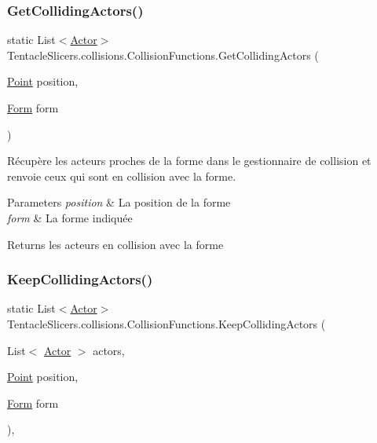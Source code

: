 \subsubsection{\texorpdfstring{Get\+Colliding\+Actors()}{GetCollidingActors()}}
{\footnotesize\ttfamily static List$<$\hyperlink{class_tentacle_slicers_1_1actors_1_1_actor}{Actor}$>$ Tentacle\+Slicers.\+collisions.\+Collision\+Functions.\+Get\+Colliding\+Actors (\begin{DoxyParamCaption}\item[{\hyperlink{class_tentacle_slicers_1_1general_1_1_point}{Point}}]{position,  }\item[{\hyperlink{class_tentacle_slicers_1_1collisions_1_1_form}{Form}}]{form }\end{DoxyParamCaption})\hspace{0.3cm}{\ttfamily [static]}}



Récupère les acteurs proches de la forme dans le gestionnaire de collision et renvoie ceux qui sont en collision avec la forme. 


\begin{DoxyParams}{Parameters}
{\em position} & La position de la forme \\
\hline
{\em form} & La forme indiquée \\
\hline
\end{DoxyParams}
\begin{DoxyReturn}{Returns}
les acteurs en collision avec la forme 
\end{DoxyReturn}
\mbox{\label{class_tentacle_slicers_1_1collisions_1_1_collision_functions_af02ae1365e63bae367e3549ce009c5e0}} 
\subsubsection{\texorpdfstring{Keep\+Colliding\+Actors()}{KeepCollidingActors()}}
{\footnotesize\ttfamily static List$<$\hyperlink{class_tentacle_slicers_1_1actors_1_1_actor}{Actor}$>$ Tentacle\+Slicers.\+collisions.\+Collision\+Functions.\+Keep\+Colliding\+Actors (\begin{DoxyParamCaption}\item[{List$<$ \hyperlink{class_tentacle_slicers_1_1actors_1_1_actor}{Actor} $>$}]{actors,  }\item[{\hyperlink{class_tentacle_slicers_1_1general_1_1_point}{Point}}]{position,  }\item[{\hyperlink{class_tentacle_slicers_1_1collisions_1_1_form}{Form}}]{form }\end{DoxyParamCaption})\hspace{0.3cm}{\ttfamily [static]}, {\ttfamily [protected]}}



